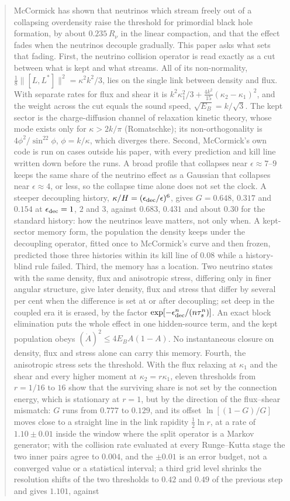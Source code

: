 \documentclass[11pt]{article}
\begin{document}
\begin{abstract}
McCormick has shown that neutrinos which stream freely out of a collapsing overdensity raise the threshold for primordial black hole formation, by about $0.235\,R_\nu$ in the linear compaction, and that the effect fades when the neutrinos decouple gradually. This paper asks what sets that fading. First, the neutrino collision operator is read exactly as a cut between what is kept and what streams. All of its non-normality, $\tfrac18\lVert[L,L^\ast]\rVert^2=\kappa^2k^2/3$, lies on the single link between density and flux. With separate rates for flux and shear it is $k^2\kappa_1^2/3+\tfrac{4k^2}{15}(\kappa_2-\kappa_1)^2$, and the weight across the cut equals the sound speed, $\sqrt{E_B}=k/\sqrt3$. The kept sector is the charge-diffusion channel of relaxation kinetic theory, whose mode exists only for $\kappa>2k/\pi$ (Romatschke); its non-orthogonality is $4\phi^2/\sin^22\phi$, $\phi=k/\kappa$, which diverges there. Second, McCormick's own code is run on cases outside his paper, with every prediction and kill line written down before the runs. A broad profile that collapses near $\epsilon\approx7$--$9$ keeps the same share of the neutrino effect as a Gaussian that collapses near $\epsilon\approx4$, or less, so the collapse time alone does not set the clock. A steeper decoupling history, $\kappa/H=(\epsilon_{\rm dec}/\epsilon)^6$, gives $G=0.648$, $0.317$ and $0.154$ at $\epsilon_{\rm dec}=1$, $2$ and $3$, against $0.683$, $0.431$ and about $0.30$ for the standard history: how the neutrinos leave matters, not only when. A kept-sector memory form, the population the density keeps under the decoupling operator, fitted once to McCormick's curve and then frozen, predicted those three histories within its kill line of $0.08$ while a history-blind rule failed. Third, the memory has a location. Two neutrino states with the same density, flux and anisotropic stress, differing only in finer angular structure, give later density, flux and stress that differ by several per cent when the difference is set at or after decoupling; set deep in the coupled era it is erased, by the factor $\exp[-\epsilon_{\rm dec}^n/(n\tau_s^n)]$. An exact block elimination puts the whole effect in one hidden-source term, and the kept population obeys $(\dot A)^2\le4E_BA(1-A)$. No instantaneous closure on density, flux and stress alone can carry this memory. Fourth, the anisotropic stress sets the threshold. With the flux relaxing at $\kappa_1$ and the shear and every higher moment at $\kappa_2=r\kappa_1$, eleven thresholds from $r=1/16$ to $16$ show that the surviving share is not set by the connection energy, which is stationary at $r=1$, but by the direction of the flux--shear mismatch: $G$ runs from $0.777$ to $0.129$, and its offset $\ln[(1-G)/G]$ moves close to a straight line in the link rapidity $\tfrac12\ln r$, at a rate of $1.10\pm0.01$ inside the window where the split operator is a Markov generator; with the collision rate evaluated at every Runge--Kutta stage the two inner pairs agree to $0.004$, and the $\pm0.01$ is an error budget, not a converged value or a statistical interval; a third grid level shrinks the resolution shifts of the two thresholds to $0.42$ and $0.49$ of the previous step and gives $1.101$, against 
\end{abstract}
\end{document}
